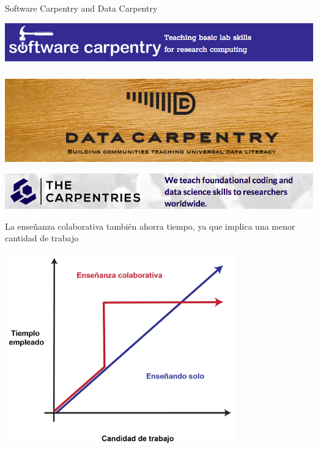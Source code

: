 \documentclass[ignorenonframetext,]{beamer}
\begin{document}
\begin{frame}{Software Carpentry and Data Carpentry}
\protect\hypertarget{software-carpentry-and-data-carpentry}{}

\includegraphics{../figures/10_talk/swc1.png}

\includegraphics{../figures/10_talk/dc-1.png}

\includegraphics{../figures/10_talk/carpentries-1.png}

\end{frame}

\begin{frame}{La enseñanza colaborativa también ahorra tiempo, ya que
implica una menor cantidad de trabajo}
\protect\hypertarget{la-ensenanza-colaborativa-tambien-ahorra-tiempo-ya-que-implica-una-menor-cantidad-de-trabajo}{}

\includegraphics[width=0.75\textwidth,height=\textheight]{../figures/10_talk/tiempo-02.png}

\end{frame}
\end{document}
